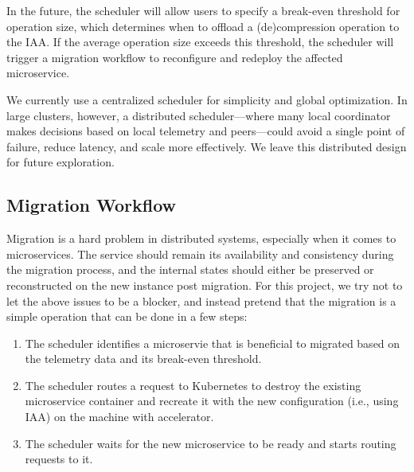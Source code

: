 In the future, the scheduler will allow users to specify a break-even threshold for operation size, which determines when to offload a (de)compression operation to the IAA.
If the average operation size exceeds this threshold, the scheduler will trigger a migration workflow to reconfigure and redeploy the affected microservice.

We currently use a centralized scheduler for simplicity and global optimization.
In large clusters, however, a distributed scheduler---where many local coordinator makes decisions based on local telemetry and peers---could avoid a single point of failure, reduce latency, and scale more effectively.
We leave this distributed design for future exploration.

\subsection{Migration Workflow}


Migration is a hard problem in distributed systems, especially when it comes to microservices.
The service should remain its availability and consistency during the migration process, and the internal states should either be preserved or reconstructed on the new instance post migration.
For this project, we try not to let the above issues to be a blocker, and instead pretend that the migration is a simple operation that can be done in a few steps:
\begin{enumerate}
  \item The scheduler identifies a microservie that is beneficial to migrated based on the telemetry data and its break-even threshold.
  \item The scheduler routes a request to Kubernetes to destroy the existing microservice container and recreate it with the new configuration (i.e., using IAA) on the machine with accelerator.
  \item The scheduler waits for the new microservice to be ready and starts routing requests to it.
\end{enumerate}
